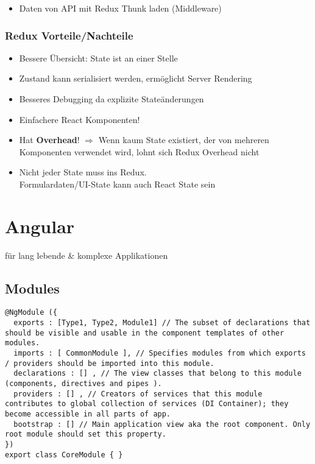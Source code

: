 \begin{multicols*}{2}
\begin{itemize}
    \item Daten von API mit Redux Thunk laden (Middleware)
\end{itemize}

\subsubsection{Redux Vorteile/Nachteile}
\begin{itemize}
    \item Bessere Übersicht: State ist an einer Stelle
    \item Zustand kann serialisiert werden, ermöglicht Server Rendering
    \item Besseres Debugging da explizite Stateänderungen
    \item Einfachere React Komponenten!
    \item Hat \textbf{Overhead}! \(\Rightarrow\) Wenn kaum State existiert, der von mehreren Komponenten verwendet wird, lohnt sich Redux Overhead nicht
    \item Nicht jeder State muss ins Redux.\\Formulardaten/UI-State kann auch React State sein
\end{itemize}

\section{Angular}
für lang lebende \& komplexe Applikationen

\subsection{Modules}
\begin{verbatim}
@NgModule ({
  exports : [Type1, Type2, Module1] // The subset of declarations that should be visible and usable in the component templates of other modules.
  imports : [ CommonModule ], // Specifies modules from which exports / providers should be imported into this module.
  declarations : [] , // The view classes that belong to this module (components, directives and pipes ).
  providers : [] , // Creators of services that this module contributes to global collection of services (DI Container); they become accessible in all parts of app.
  bootstrap : [] // Main application view aka the root component. Only root module should set this property.
})
export class CoreModule { }
\end{verbatim}


\end{multicols*}
